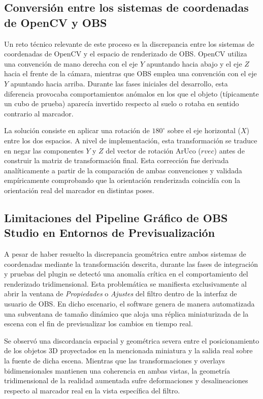\subsection{Conversión entre los sistemas de coordenadas de OpenCV y OBS}
\label{subsec:conversion_coordenadas}

Un reto técnico relevante de este proceso es la discrepancia entre los sistemas de coordenadas de OpenCV y el espacio de renderizado de OBS. OpenCV utiliza una convención de mano derecha con el eje $Y$ apuntando hacia abajo y el eje $Z$ hacia el frente de la cámara, mientras que OBS emplea una convención con el eje $Y$ apuntando hacia arriba. Durante las fases iniciales del desarrollo, esta diferencia provocaba comportamientos anómalos en los que el objeto (típicamente un cubo de prueba) aparecía invertido respecto al suelo o rotaba en sentido contrario al marcador.

La solución consiste en aplicar una rotación de $180^\circ$ sobre el eje horizontal ($X$) entre los dos espacios. A nivel de implementación, esta transformación se traduce en negar las componentes $Y$ y $Z$ del vector de rotación ArUco ($rvec$) antes de construir la matriz de transformación final. Esta corrección fue derivada analíticamente a partir de la comparación de ambas convenciones y validada empíricamente comprobando que la orientación renderizada coincidía con la orientación real del marcador en distintas poses.

\subsection{Limitaciones del Pipeline Gráfico de OBS Studio en Entornos de Previsualización}
\label{subsec:limitaciones_pipeline_obs}

A pesar de haber resuelto la discrepancia geométrica entre ambos sistemas de coordenadas mediante la transformación descrita, durante las fases de integración y pruebas del plugin se detectó una anomalía crítica en el comportamiento del renderizado tridimensional. Esta problemática se manifiesta exclusivamente al abrir la ventana de \textit{Propiedades} o \textit{Ajustes} del filtro dentro de la interfaz de usuario de OBS. En dicho escenario, el software genera de manera automatizada una subventana de tamaño dinámico que aloja una réplica miniaturizada de la escena con el fin de previsualizar los cambios en tiempo real.

Se observó una discordancia espacial y geométrica severa entre el posicionamiento de los objetos 3D proyectados en la mencionada miniatura y la salida real sobre la fuente de dicha escena. Mientras que las transformaciones y overlays bidimensionales mantienen una coherencia en ambas vistas, la geometría tridimensional de la realidad aumentada sufre deformaciones y desalineaciones respecto al marcador real en la vista específica del filtro.

